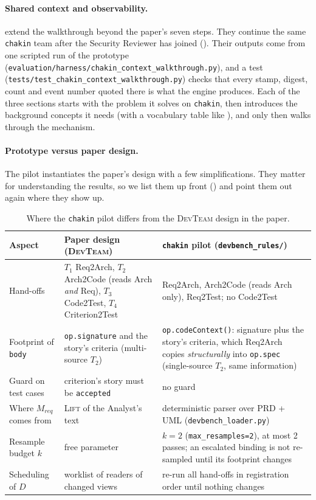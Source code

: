 \documentclass[10pt,a4paper]{article}
\newcommand{\devteam}{\textsc{DevTeam}}
\newcommand{\code}[1]{\texttt{#1}}
\newcommand{\file}[1]{\texttt{#1}}
\theoremstyle{definition}
\begin{document}
\paragraph{Shared context and observability.} 
extend the walkthrough beyond the paper's seven steps. They continue the same
\texttt{chakin} team after the Security Reviewer has joined ().
Their outputs come from one scripted run of the prototype
(\file{evaluation/harness/chakin\_context\_walkthrough.py}), and a test
(\file{tests/test\_chakin\_context\_walkthrough.py}) checks that every stamp,
digest, count and event number quoted there is what the engine produces.
Each of the three sections starts with the problem it solves on
\texttt{chakin}, then introduces the background concepts it needs (with a
vocabulary table like ), and only then walks through the
mechanism.

\paragraph{Prototype versus paper design.} The pilot instantiates the paper's
design with a few simplifications. They matter for understanding the results,
so we list them up front () and point them out again where they
show up.

\begin{table}[h]
\centering\small
\caption{Where the \texttt{chakin} pilot differs from the \devteam{} design in the paper.}
\label{tab:diff}
\begin{tabularx}{\textwidth}{@{}l X X@{}}
\toprule
Aspect & Paper design (\devteam{}) & \texttt{chakin} pilot (\file{devbench_rules/}) \\
\midrule
Hand-offs & $T_1$ Req2Arch, $T_2$ Arch2Code (reads Arch \emph{and} Req), $T_3$ Code2Test, $T_4$ Criterion2Test & Req2Arch, Arch2Code (reads Arch only), Req2Test; no Code2Test \\
Footprint of \code{body} & \code{op.signature} and the story's criteria (multi-source $T_2$) & \code{op.codeContext()}: signature plus the story's criteria, which Req2Arch copies \emph{structurally} into \code{op.spec} (single-source $T_2$, same information) \\
Guard on test cases & criterion's story must be \code{accepted} & no guard \\
Where $M_{\mathit{req}}$ comes from & \textsc{Lift} of the Analyst's text & deterministic parser over PRD + UML (\file{devbench_loader.py}) \\
Resample budget $k$ & free parameter & $k=2$ (\code{max_resamples=2}), at most 2 passes; an escalated binding is not re-sampled until its footprint changes \\
Scheduling of $D$ & worklist of readers of changed views & re-run all hand-offs in registration order until nothing changes \\
\bottomrule
\end{tabularx}
\end{table}
\end{document}
